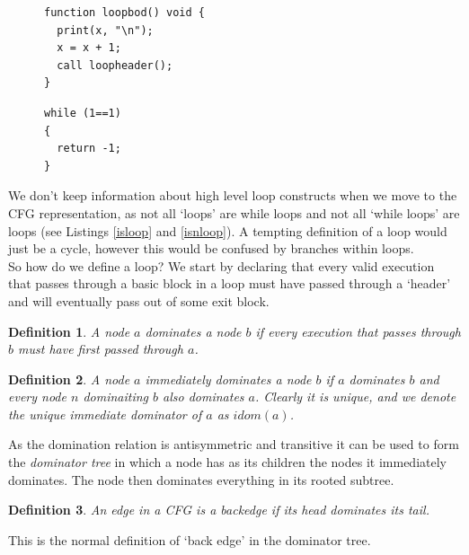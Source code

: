 \documentclass[12pt,a4paper]{article}
\newtheorem{definition}{Definition}
\begin{document}
\begin{enumerate}
\begin{figure}
\begin{minipage}{.45\textwidth}
\begin{lstlisting}[caption=A loop.,frame=tlrb, language=myLang, label={isloop}]
function loopbod() void {
  print(x, "\n");
  x = x + 1;
  call loopheader();
}
\end{lstlisting}
\end{minipage}\hfill
\begin{minipage}{.45\textwidth}
\begin{lstlisting}[caption=Not a loop.,frame=tlrb, language=myLang, label={isnloop}]
while (1==1)
{
  return -1;
}
\end{lstlisting}
\end{minipage}
\end{figure}

We don't keep information about high level loop constructs when we move to the CFG representation, as not all `loops' are while loops and not all `while loops' are loops (see Listings \ref{isloop} and \ref{isnloop}). A tempting definition of a loop would just be a cycle, however this would be confused by branches within loops.\\
So how do we define a loop? We start by declaring that every valid execution that passes through a basic block in a loop must have passed through 
a `header' and will eventually pass out of some exit block.\par

\begin{definition}\label{def:dominator}
A node $a$ \emph{dominates} a node $b$ if every execution that passes through $b$ must have first passed through $a$.
\end{definition}

\begin{definition}\label{def:immediatedominator}
A node $a$ \emph{immediately dominates} a node $b$ if $a$ dominates $b$ and every node $n$ dominaiting $b$ also dominates $a$. Clearly it is unique, and we denote
the unique immediate dominator of $a$ as $idom(a)$.
\end{definition}

As the domination relation is antisymmetric and transitive it can be used to form the \emph{dominator tree} in which a node has as its children the nodes it
immediately dominates. The node then dominates everything in its rooted subtree.

\begin{definition}\label{def:backedge}
An edge in a CFG is a \em{backedge} if its head dominates its tail.
\end{definition}

This is the normal definition of `back edge' in the dominator tree.


\end{enumerate}
\end{document}
